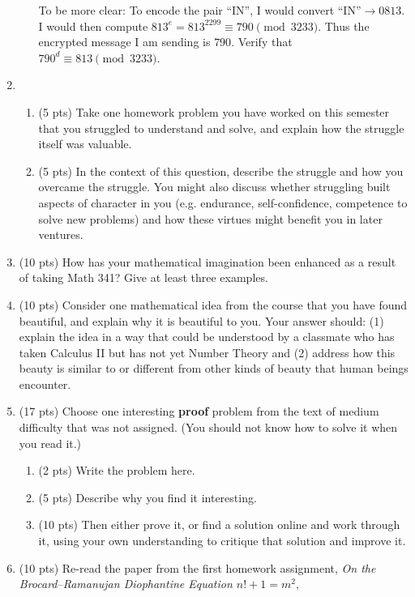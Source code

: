 \documentclass[12pt]{article}
\begin{document}
\begin{enumerate}
\begin{enumerate}
			To be more clear: To encode the pair ``IN'', I would convert ``IN''$\rightarrow 0813$.  I would then compute $813^e=813^{2299}\equiv 790\pmod{3233}$.  Thus the encrypted message I am sending is $790$.  Verify that $790^d\equiv 813\pmod{3233}$.
			\vfill
		\end{enumerate}
	\newpage
		\item
			\begin{enumerate}
				\item (5 pts) Take one homework problem you have worked on this semester that you struggled to understand and solve, and explain how the struggle itself was valuable.
				\vfill
				\item (5 pts) In the context of this question, describe the struggle and how you overcame the struggle. You might also discuss whether struggling built aspects of character in you (e.g. endurance, self-confidence, competence to solve new problems) and how these virtues might benefit you in later ventures.
				\vfill
			\end{enumerate} 
		\newpage
		\item (10 pts) How has your mathematical imagination been enhanced as a result of taking Math 341?  Give at least three examples.
			\vfill 
		\item (10 pts) Consider one mathematical idea from the course that you have found beautiful, and explain why it is beautiful to you.  Your answer should: (1) explain the idea in a way that could be understood by a classmate who has taken Calculus II but has not yet Number Theory and (2) address how this beauty is similar to or different from other kinds of beauty that human beings encounter.
		\vfill
		\newpage
		\item (17 pts) Choose one interesting \textbf{proof} problem from the text of medium difficulty that was not assigned. (You should not know how to solve it when you read it.) 
			\begin{enumerate}
				\item (2 pts) Write the problem here.
				\vskip 1in
				\item (5 pts) Describe why you find it interesting.
				\vskip 1in
				\item (10 pts) Then either prove it, or find a solution online and work through it, using your own understanding to critique that solution and improve it. 
				\vfill
			\end{enumerate}
		\newpage	
		\item (10 pts) Re-read the paper from the first homework assignment, \textit{On the Brocard--Ramanujan Diophantine Equation $n!+1=m^2$}, \begin{center}

\end{center}
\end{enumerate}
\end{document}
